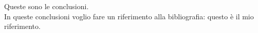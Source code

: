  Queste sono le
conclusioni.\\
In queste conclusioni\cite{latexcompanion} voglio fare un riferimento alla
bibliografia: questo \`e il mio riferimento.\cite{einstein}
\renewcommand{\chaptermark}[1]{\markright{\thechapter \ #1}{}}
\lhead[\fancyplain{}{\bfseries\thepage}]{\fancyplain{}{\bfseries\rightmark}}